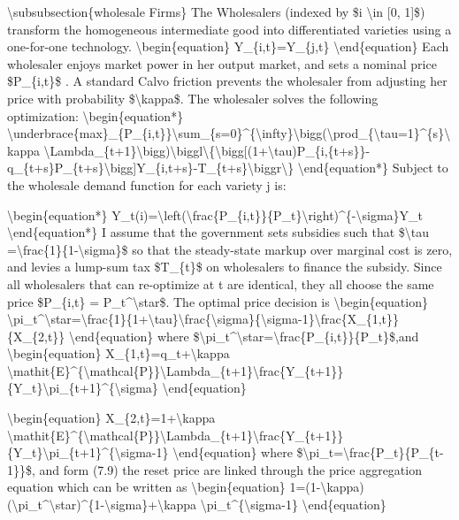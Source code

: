 \documentclass[10pt,math=newtx,citestyle=gb7714-2015,bibstyle=gb7714-2015]{elegantbook}
\begin{document}
	\textbackslash{}subsubsection\{wholesale Firms\}
	The Wholesalers (indexed by \$i \textbackslash{}in [0, 1]\$) transform the homogeneous intermediate good into differentiated varieties using a one-for-one technology.
	\textbackslash{}begin\{equation\}
	Y\_\{i,t\}=Y\_\{j,t\}
	\textbackslash{}end\{equation\}
	Each wholesaler enjoys market power in her output market, and sets a nominal price \$P\_\{i,t\}\$ . A standard Calvo friction prevents the wholesaler from adjusting her price with probability \$\textbackslash{}kappa\$. The wholesaler solves the following optimization:
	\textbackslash{}begin\{equation*\}
	\textbackslash{}underbrace\{max\}\_\{P\_\{i,t\}\}\textbackslash{}sum\_\{s=0\}\^{}\{\textbackslash{}infty\}\textbackslash{}bigg(\textbackslash{}prod\_\{\textbackslash{}tau=1\}\^{}\{s\}\textbackslash{}kappa \textbackslash{}Lambda\_\{t+1\}\textbackslash{}bigg)\textbackslash{}biggl\textbackslash{}\{\textbackslash{}bigg[(1+\textbackslash{}tau)P\_\{i,\{t+s\}\}-q\_\{t+s\}P\_\{t+s\}\textbackslash{}bigg]Y\_\{i,t+s\}-T\_\{t+s\}\textbackslash{}biggr\textbackslash{}\}
	\textbackslash{}end\{equation*\}
	Subject to the wholesale demand function for each variety j is:
	
	\textbackslash{}begin\{equation*\}
	Y\_t(i)=\textbackslash{}left(\textbackslash{}frac\{P\_\{i,t\}\}\{P\_t\}\textbackslash{}right)\^{}\{-\textbackslash{}sigma\}Y\_t
	\textbackslash{}end\{equation*\}
	I assume that the government sets subsidies such that \$\textbackslash{}tau =\textbackslash{}frac\{1\}\{1-\textbackslash{}sigma\}\$ so that the steady-state markup over marginal cost is zero, and levies a lump-sum tax \$T\_\{t\}\$ on wholesalers to finance the subsidy. Since all wholesalers that can re-optimize at t are identical, they all choose the
	same price \$P\_\{i,t\} = P\_t\^{}\textbackslash{}star\$. The optimal price decision is
	\textbackslash{}begin\{equation\}
	\textbackslash{}pi\_t\^{}\textbackslash{}star=\textbackslash{}frac\{1\}\{1+\textbackslash{}tau\}\textbackslash{}frac\{\textbackslash{}sigma\}\{\textbackslash{}sigma-1\}\textbackslash{}frac\{X\_\{1,t\}\}\{X\_\{2,t\}\}
	\textbackslash{}end\{equation\}
	where \$\textbackslash{}pi\_t\^{}\textbackslash{}star=\textbackslash{}frac\{P\_\{i,t\}\}\{P\_t\}\$,and
	\textbackslash{}begin\{equation\}
	X\_\{1,t\}=q\_t+\textbackslash{}kappa \textbackslash{}mathit\{E\}\^{}\{\textbackslash{}mathcal\{P\}\}\textbackslash{}Lambda\_\{t+1\}\textbackslash{}frac\{Y\_\{t+1\}\}\{Y\_t\}\textbackslash{}pi\_\{t+1\}\^{}\{\textbackslash{}sigma\}
	\textbackslash{}end\{equation\}
	
	\textbackslash{}begin\{equation\}
	X\_\{2,t\}=1+\textbackslash{}kappa \textbackslash{}mathit\{E\}\^{}\{\textbackslash{}mathcal\{P\}\}\textbackslash{}Lambda\_\{t+1\}\textbackslash{}frac\{Y\_\{t+1\}\}\{Y\_t\}\textbackslash{}pi\_\{t+1\}\^{}\{\textbackslash{}sigma-1\}
	\textbackslash{}end\{equation\}
	where \$\textbackslash{}pi\_t=\textbackslash{}frac\{P\_t\}\{P\_\{t-1\}\}\$, and form (7.9) the reset price are linked through the price aggregation equation which can be written as
	\textbackslash{}begin\{equation\}
	1=(1-\textbackslash{}kappa)(\textbackslash{}pi\_t\^{}\textbackslash{}star)\^{}\{1-\textbackslash{}sigma\}+\textbackslash{}kappa \textbackslash{}pi\_t\^{}\{\textbackslash{}sigma-1\}
	\textbackslash{}end\{equation\}
	
\end{document}
